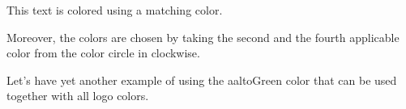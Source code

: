 \documentclass{article}
\begin{document}
\begin{minipage}{\linewidth}
\vskip13mm
\vskip13mm
\null
\end{minipage}

\textcolor{aaltoColor\arabic{aaltologo_color}2}{%
This text is colored using a matching color}.

Moreover, the colors are
\textcolor{aaltoColor\arabic{aaltologo_color}4}{chosen} by
taking the \textcolor{aaltoColor\arabic{aaltologo_color}2}{second}
and the \textcolor{aaltoColor\arabic{aaltologo_color}4}{fourth}
applicable color from the color circle
in clockwise.

Let's have yet another example of using the
\textcolor{aaltoGreen}{aaltoGreen} color that can be used
together with all logo colors.
\end{document}

